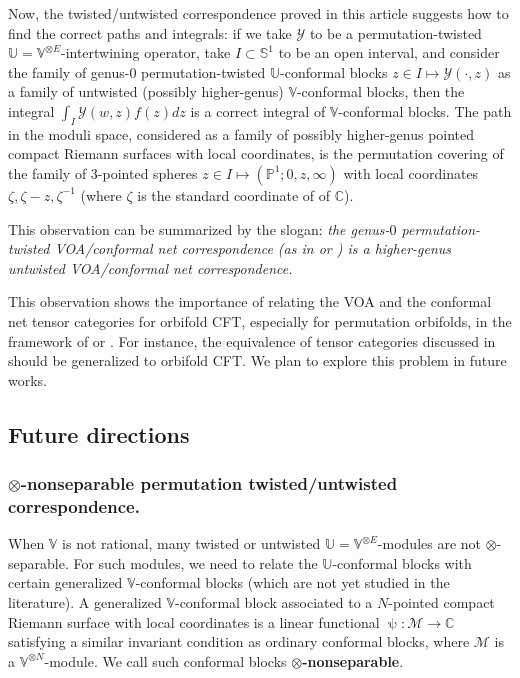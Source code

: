 \documentclass[12pt,a4paper,notitlepage]{article}
\theoremstyle{definition}
\theoremstyle{plain}
\newcommand{\mc}{\mathcal}
\newcommand{\mbb}{\mathbb}
\newcommand{\Vbb}{\mathbb V}
\newcommand{\Ubb}{\mathbb U}
\newcommand{\Cbb}{\mathbb C}
\newcommand{\Pbb}{\mathbb P}
\numberwithin{equation}{subsection}
\begin{document}
Now, the twisted/untwisted correspondence proved in this article suggests how to find the correct paths and integrals: if we take $\mc Y$ to be a permutation-twisted $\Ubb=\Vbb^{\otimes E}$-intertwining operator, take $I\subset \mbb S^1$ to be an open interval, and consider the family of genus-$0$ permutation-twisted $\Ubb$-conformal blocks $z\in I\mapsto \mc Y(\cdot,z)$ as a family of untwisted (possibly higher-genus) $\Vbb$-conformal blocks, then the integral $\int_I \mc Y(w,z)f(z)dz$ is a correct integral of $\Vbb$-conformal blocks. The path in the moduli space, considered as a family of possibly higher-genus pointed compact Riemann surfaces with local coordinates, is the permutation covering of the family of $3$-pointed spheres $z\in I\mapsto (\Pbb^1;0,z,\infty)$ with local coordinates $\zeta,\zeta-z,\zeta^{-1}$ (where $\zeta$ is the standard coordinate of of $\Cbb$). 

This observation can be summarized by the slogan: \emph{the genus-$0$ permutation-twisted VOA/conformal net correspondence (as in \cite{CKLW18} or \cite{Ten19a}) is a higher-genus untwisted VOA/conformal net correspondence.}

This observation shows the  importance of relating the VOA and the conformal net tensor categories  for orbifold CFT, especially for permutation orbifolds, in the framework of \cite{CKLW18} or \cite{Ten19a}. For instance, the equivalence of tensor categories discussed in \cite{Gui21a,Gui20a} should be generalized to orbifold CFT. We plan to explore this problem in future works.




\subsection{Future directions}



\subsubsection*{$\otimes$-nonseparable permutation twisted/untwisted correspondence.}

	

When $\Vbb$ is not rational, many twisted or untwisted  $\Ubb=\Vbb^{\otimes E}$-modules are not $\otimes$-separable. For such modules, we need to relate the $\Ubb$-conformal blocks with certain generalized $\Vbb$-conformal blocks (which are not yet studied in the literature). A generalized $\Vbb$-conformal block associated to a $N$-pointed compact Riemann surface with local coordinates is a linear functional $\uppsi:\mc M\rightarrow\Cbb$ satisfying a similar invariant condition as ordinary conformal blocks, where $\mc M$ is a $\Vbb^{\otimes N}$-module. We call such conformal blocks \textbf{$\otimes$-nonseparable}. 
\end{document}
